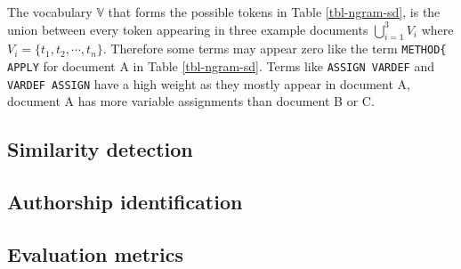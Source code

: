 \noindent
The vocabulary $\mathbb{V}$ that forms the possible tokens in Table \ref{tbl-ngram-sd}, is the union between every token appearing in three example documents \ie $\bigcup_{i=1}^{3} V_i$ where $V_i = \{t_1, t_2, \cdots, t_n\}$. Therefore some terms may appear zero like the term \texttt{METHOD\{ APPLY} for document A in Table \ref{tbl-ngram-sd}. Terms like \texttt{ASSIGN VARDEF} and \texttt{VARDEF ASSIGN} have a high weight as they mostly appear in document A, \ie document A has more variable assignments than document B or C. 

%
%

\newpage


\subsection{Similarity detection}


\subsection{Authorship identification}



\subsection{Evaluation metrics}